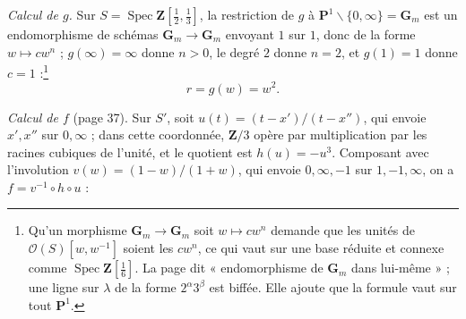 \documentclass[11pt,a4paper]{article}
\begin{document}
\emph{Calcul de $g$.} Sur $S = \operatorname{Spec}\mathbf{Z}[\frac12,
\frac13]$, la restriction de $g$ à $\mathbf{P}^1 \smallsetminus \{0, \infty\} =
\mathbf{G}_m$ est un endomorphisme de schémas $\mathbf{G}_m \to \mathbf{G}_m$
envoyant $1$ sur $1$, donc de la forme $w \mapsto cw^n$ ; $g(\infty) = \infty$
donne $n > 0$, le degré $2$ donne $n = 2$, et $g(1) = 1$ donne $c = 1$ :\footnote{Qu'un morphisme $\mathbf{G}_m \to \mathbf{G}_m$ soit $w \mapsto cw^n$
demande que les unités de $\mathcal{O}(S)[w, w^{-1}]$ soient les $cw^n$, ce
qui vaut sur une base réduite et connexe comme $\operatorname{Spec}\mathbf{Z}[\frac16]$.
La page dit « endomorphisme de $\mathbf{G}_m$ dans lui-même » ; une ligne sur
$\lambda$ de la forme $2^\alpha3^\beta$ est biffée. Elle ajoute que la formule vaut sur tout $\mathbf{P}^1$.}
\[
r = g(w) = w^2 . \tag{9}
\]


\emph{Calcul de $f$} (page 37). Sur $S'$, soit $u(t) = (t - x')/(t -
x'')$, qui envoie $x', x''$ sur $0, \infty$ ; dans cette coordonnée, $\mathbf{Z}/3$
opère par multiplication par les racines cubiques de l'unité, et le quotient est
$h(u) = -u^3$. Composant avec l'involution $v(w) = (1-w)/(1+w)$, qui
envoie $0, \infty, -1$ sur $1, -1, \infty$, on a $f = v^{-1} \circ h \circ u$ :

\end{document}

